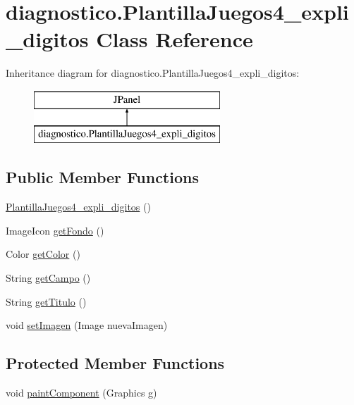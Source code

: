 \hypertarget{classdiagnostico_1_1_plantilla_juegos4__expli__digitos}{}\section{diagnostico.\+Plantilla\+Juegos4\+\_\+expli\+\_\+digitos Class Reference}
\label{classdiagnostico_1_1_plantilla_juegos4__expli__digitos}
Inheritance diagram for diagnostico.\+Plantilla\+Juegos4\+\_\+expli\+\_\+digitos\+:\begin{figure}[H]
\begin{center}
\leavevmode
\includegraphics[height=2.000000cm]{classdiagnostico_1_1_plantilla_juegos4__expli__digitos}
\end{center}
\end{figure}
\subsection*{Public Member Functions}
\begin{DoxyCompactItemize}
\item 
\mbox{\hyperlink{classdiagnostico_1_1_plantilla_juegos4__expli__digitos_aea52aa8d6a0423f7ac404e83f1209c9e}{Plantilla\+Juegos4\+\_\+expli\+\_\+digitos}} ()
\item 
Image\+Icon \mbox{\hyperlink{classdiagnostico_1_1_plantilla_juegos4__expli__digitos_aa0b86c23bd8255b9895e1e194c47d776}{get\+Fondo}} ()
\item 
Color \mbox{\hyperlink{classdiagnostico_1_1_plantilla_juegos4__expli__digitos_ad6f0591875018a33056745d28ea51b2d}{get\+Color}} ()
\item 
String \mbox{\hyperlink{classdiagnostico_1_1_plantilla_juegos4__expli__digitos_ae93ef32e86fb813a7f2a59b6d6882dfd}{get\+Campo}} ()
\item 
String \mbox{\hyperlink{classdiagnostico_1_1_plantilla_juegos4__expli__digitos_a2c060fec622f32b85c73479fc798d914}{get\+Titulo}} ()
\item 
void \mbox{\hyperlink{classdiagnostico_1_1_plantilla_juegos4__expli__digitos_a884a6fc09fbe9eb179ddfba4633a4987}{set\+Imagen}} (Image nueva\+Imagen)
\end{DoxyCompactItemize}
\subsection*{Protected Member Functions}
\begin{DoxyCompactItemize}
\item 
void \mbox{\hyperlink{classdiagnostico_1_1_plantilla_juegos4__expli__digitos_a255e96aded34f01ba4dda0ee3a4f3c3f}{paint\+Component}} (Graphics g)
\end{DoxyCompactItemize}


